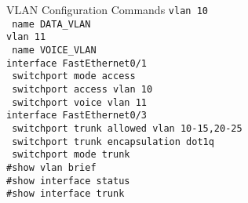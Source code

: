 \begin{frame}{VLAN Configuration Commands}
\texttt{vlan 10 \\
	\ name DATA\_VLAN \\
	vlan 11 \\
	\ name VOICE\_VLAN \\
	interface FastEthernet0/1 \\
	\ switchport mode access \\
	\ switchport access vlan 10 \\
	\ switchport voice vlan 11 \\
	interface FastEthernet0/3 \\
	\ switchport trunk allowed vlan 10-15,20-25 \\
	\ switchport trunk encapsulation dot1q \\
	\ switchport mode trunk \\
	\#show vlan brief \\
	\#show interface status \\
	\#show interface trunk \\
}
\end{frame}
